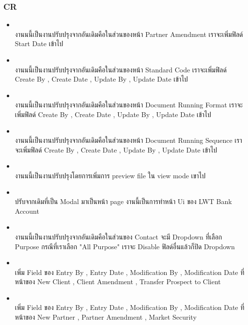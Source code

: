 \subsubsection{CR}
\begin{itemize}
    \setlength\itemsep{1em}
    \item \textbf{} \\
          งานนนี้เป็นงานปรับปรุงจากอันเดิมคือในส่วนของหน้า Partner Amendment เราจะเพิ่มฟิลด์ Start Date เข้าไป
    \item \textbf{} \\
          งานนนี้เป็นงานปรับปรุงจากอันเดิมคือในส่วนของหน้า Standard Code เราจะเพิ่มฟิลด์ Create By , Create Date , Update By , Update Date เข้าไป
    \item \textbf{} \\
          งานนนี้เป็นงานปรับปรุงจากอันเดิมคือในส่วนของหน้า Document Running Format เราจะเพิ่มฟิลด์ Create By , Create Date , Update By , Update Date เข้าไป
    \item \textbf{} \\
          งานนนี้เป็นงานปรับปรุงจากอันเดิมคือในส่วนของหน้า Document Running Sequence เราจะเพิ่มฟิลด์ Create By , Create Date , Update By , Update Date เข้าไป
    \item \textbf{} \\
          งานนนี้เป็นงานปรับปรุงโดยการเพิ่มการ preview file ใน view mode เขาไป
    \item \textbf{} \\
          ปรับจากเดิมที่เป็น Modal มาเป็นหน้า page งานนี้เป็นการทำหน้า Ui ของ LWT Bank Account
    \item \textbf{} \\
          งานนนี้เป็นงานปรับปรุงจากอันเดิมคือในส่วนของ Contact จะมี Dropdown ที่เลือก Purpose กรณีที่เราเลือก "All Purpose" เราจะ Disable ฟิลด์อื่นแล้วก็ปิด Dropdown
    \item \textbf{} \\
          เพิ่ม Field ของ Entry By , Entry Date , Modification By , Modification Date ที่หน้าของ New Client , Client Amendment , Transfer Prospect to Client
    \item \textbf{} \\
          เพิ่ม Field ของ Entry By , Entry Date , Modification By , Modification Date ที่หน้าของ New Partner , Partner Amendment , Market Security 
\end{itemize}

